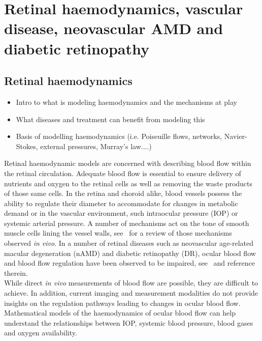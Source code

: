 \documentclass[12pt,a4paper]{article}
\begin{document}
\section{Retinal haemodynamics, vascular disease, neovascular AMD and diabetic retinopathy}

\subsection{Retinal haemodynamics}
\begin{itemize}
\item Intro to what is modeling haemodynamics and the mechanisms at play
\item What diseases and treatment can benefit from modeling this
\item Basis of modelling haemodynamics (i.e. Poiseuille flows, networks, Navier-Stokes, external pressures, Murray's law....)
\end{itemize}
Retinal haemodynamic models are concerned with describing blood flow within the retinal circulation.
Adequate blood flow is essential to ensure delivery of nutrients and oxygen to the retinal cells as well as removing the waste products of those same cells.
In the retina and choroid alike, blood vessels possess the ability to regulate their diameter to accommodate for changes in metabolic demand or in the vascular environment, such intraocular pressure (IOP) or systemic arterial pressure.
A number of mechanisms act on the tone of smooth muscle cells lining the vessel walls, see~\cite{Kur_2012} for a review of those mechanisms observed \textit{in vivo}.
In a number of retinal diseases such as neovascular age-related macular degeneration (nAMD) and diabetic retinopathy (DR), ocular blood flow and blood flow regulation have been observed to be impaired, see~\cite{Kur_2012} and reference therein.\\
While direct \textit{in vivo} measurements of blood flow are possible, they are difficult to achieve.
In addition, current imaging and measurement modalities do not provide insights on the regulation pathways leading to changes in ocular blood flow.
Mathematical models of the haemodynamics of ocular blood flow can help understand the relationships between IOP, systemic blood pressure, blood gases and oxygen availability.
\end{document}
